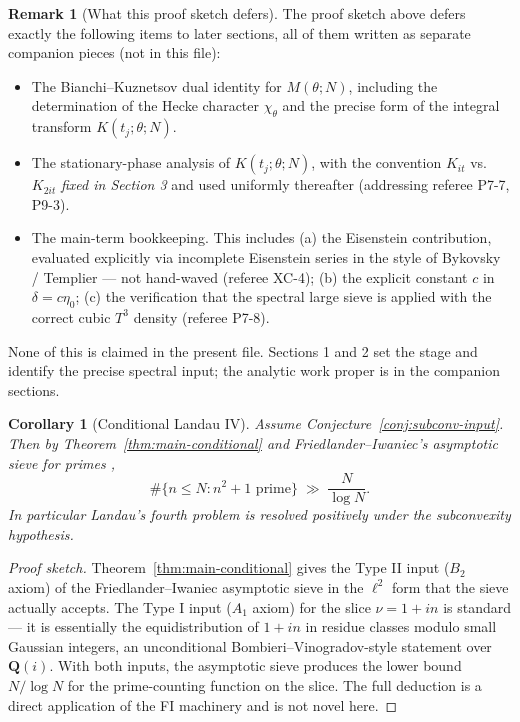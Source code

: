 \documentclass[11pt]{article}
\newtheorem{corollary}[theorem]{Corollary}
\theoremstyle{definition}
\newtheorem{remark}[theorem]{Remark}
\newcommand{\Q}{\mathbf{Q}}
\newcommand{\Qi}{\Q(i)}
\begin{document}
\begin{remark}[What this proof sketch defers]\label{rmk:deferred}
The proof sketch above defers exactly the following items to later sections, all of them written as separate companion pieces (not in this file):
\begin{itemize}
\item[\textbf{Section 3:}] The Bianchi--Kuznetsov dual identity for $M(\theta;N)$, including the determination of the Hecke character $\chi_\theta$ and the precise form of the integral transform $K(t_j;\theta;N)$.
\item[\textbf{Section 4:}] The stationary-phase analysis of $K(t_j;\theta;N)$, with the convention $K_{it}$ vs. $K_{2it}$ \emph{fixed in Section 3} and used uniformly thereafter (addressing referee P7-7, P9-3).
\item[\textbf{Section 5:}] The main-term bookkeeping. This includes (a) the Eisenstein contribution, evaluated explicitly via incomplete Eisenstein series in the style of Bykovsky / Templier --- not hand-waved (referee XC-4); (b) the explicit constant $c$ in $\delta=c\eta_0$; (c) the verification that the spectral large sieve is applied with the correct cubic $T^3$ density (referee P7-8).
\end{itemize}
None of this is claimed in the present file. Sections 1 and 2 set the stage and identify the precise spectral input; the analytic work proper is in the companion sections.
\end{remark}

\begin{corollary}[Conditional Landau IV]\label{cor:cond-landau}
Assume Conjecture~\ref{conj:subconv-input}. Then by Theorem~\ref{thm:main-conditional} and Friedlander--Iwaniec's asymptotic sieve for primes \cite{FI98a, FI98b},
\[
\#\{n\le N:n^2+1\text{ prime}\}\;\gg\;\frac{N}{\log N}.
\]
In particular Landau's fourth problem is resolved positively under the subconvexity hypothesis.
\end{corollary}

\begin{proof}[Proof sketch]
Theorem~\ref{thm:main-conditional} gives the Type II input ($B_2$ axiom) of the Friedlander--Iwaniec asymptotic sieve in the $\ell^2$ form that the sieve actually accepts. The Type I input ($A_1$ axiom) for the slice $\nu=1+in$ is standard --- it is essentially the equidistribution of $1+in$ in residue classes modulo small Gaussian integers, an unconditional Bombieri--Vinogradov-style statement over $\Qi$. With both inputs, the asymptotic sieve produces the lower bound $N/\log N$ for the prime-counting function on the slice. The full deduction is a direct application of the FI machinery and is not novel here.
\end{proof}
\end{document}
